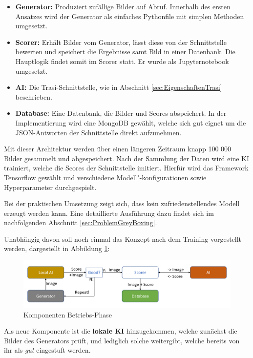 \begin{itemize}
	\item \textbf{Generator:} Produziert zufällige Bilder auf Abruf. 
	Innerhalb des ersten Ansatzes wird der Generator als einfaches Pythonfile mit simplen Methoden umgesetzt.
	\item \textbf{Scorer:} Erhält Bilder vom Generator, lässt diese von der Schnittstelle bewerten und speichert die Ergebnisse samt Bild in einer Datenbank. 
	Die Hauptlogik findet somit im Scorer statt. 
	Er wurde als Jupyternotebook umgesetzt.
	\item \textbf{\ac{AI}:} Die Trasi-Schnittstelle, wie in Abschnitt \ref{sec:EigenschaftenTrasi} beschrieben.
	\item \textbf{Database:} Eine Datenbank, die Bilder und Scores abspeichert.
	In der Implementierung wird eine MongoDB gewählt, welche sich gut eignet um die JSON-Antworten der Schnittstelle direkt aufzunehmen. 
\end{itemize}

Mit dieser Architektur werden über einen längeren Zeitraum knapp 100 000 Bilder gesammelt und abgespeichert. 
Nach der Sammlung der Daten wird eine \ac{KI} trainiert, welche die Scores der Schnittstelle imitiert. 
Hierfür wird das Framework Tensorflow gewählt und verschiedene Modell"-konfigurationen sowie Hyperparameter durchgespielt. 

Bei der praktischen Umsetzung zeigt sich, dass kein zufriedenstellendes Modell erzeugt werden kann. 
Eine detaillierte Ausführung dazu findet sich im nachfolgenden Abschnitt \ref{sec:ProblemGreyBoxing}.

Unabhängig davon soll noch einmal das Konzept nach dem Training vorgestellt werden, dargestellt in Abbildung \ref{fig:greyboxingrunning}: 
 \begin{figure}[h]
 	\centering
 	\includegraphics[width=0.9\linewidth]{Images/GreyBoxingRunning}
 	\caption{Komponenten Betriebs-Phase}
 	\label{fig:greyboxingrunning}
 \end{figure}
Als neue Komponente ist die \textbf{lokale \ac{KI}} hinzugekommen, welche zunächst die Bilder des Generators prüft, und lediglich solche weitergibt, welche bereits von ihr als \textit{gut} eingestuft werden. 
 
